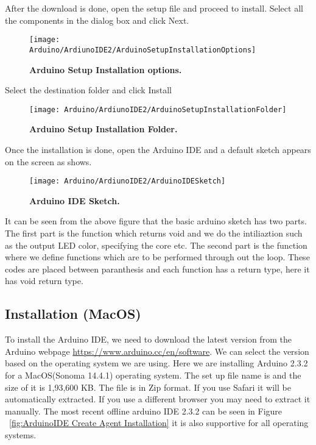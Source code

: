 After the download is done, open the setup file and proceed to install.
Select all the components in the dialog box and click Next.

\begin{figure}[H]\centering
    \texttt{[image: Arduino/ArdiunoIDE2/ArduinoSetupInstallationOptions]}
    \caption{\textbf{Arduino Setup Installation options.}}
    \label{fig:Arduino Setup Installation options}		
\end{figure}

Select the destination folder and click Install

\begin{figure}[H]\centering
    \texttt{[image: Arduino/ArdiunoIDE2/ArduinoSetupInstallationFolder]}
    \caption{\textbf{Arduino Setup Installation Folder.}}
    \label{fig:Arduino Setup Installation Folder}		
\end{figure}

Once the installation is done, open the Arduino IDE and a default sketch appears on the screen as shows.

\begin{figure}[H]\centering
    \texttt{[image: Arduino/ArdiunoIDE2/ArduinoIDESketch]}
    \caption{\textbf{Arduino IDE Sketch.}}
    \label{fig:Arduino IDE Sketch}		
\end{figure}


It can be seen from the above figure that the basic arduino sketch has two parts. The first part is the function  which returns void and we do the intiliaztion such as the output LED color, specifying the core etc. The second part is the function  where we define functions which are to be performed through out the loop. These codes are placed between paranthesis \PYTHON{$\{ \}$} and each function has a return type, here it has void return type.


\subsection{Installation (MacOS)}

To install the Arduino IDE, we need to download the latest version from the Arduino webpage \url{https://www.arduino.cc/en/software}. We can select the version based on the operating system we are using. Here we are installing Arduino 2.3.2 for a MacOS(Sonoma 14.4.1) operating system. The set up file name is  and the size of it is 1,93,600 KB. The file is in Zip format. If you use Safari it will be automatically extracted. If you use a different browser you may need to extract it manually. The most recent offline arduino IDE 2.3.2 can be seen in Figure ~\ref{fig:ArduinoIDE Create Agent Installation} it is also supportive for all operating systems.

